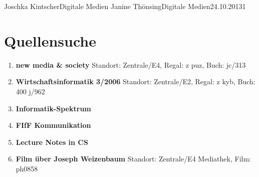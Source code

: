 \documentclass{lib/wa}
\begin{document}
  {Joschka Kintscher}{Digitale Medien}
  {Janine Thönsing}{Digitale Medien}{24.10.2013}{1}


\section{Quellensuche}

  \begin{enumerate}
    \item\textbf{new media \& society}
    \newline
    Standort: Zentrale/E4, Regal: z puz, Buch: jc/313
    \newline
    \cite{vergeer2013}

    \item\textbf{Wirtschaftsinformatik 3/2006}
    \newline
    Standort: Zentrale/E2, Regal: z kyb, Buch: 400 j/962
    \newline
    \cite{thiesse2006}

    \item\textbf{Informatik-Spektrum}
    \newline
    \cite{lintu2009}

    \item\textbf{FIfF Kommunikation}
    \newline
    \cite{bockerman2013}

    \item\textbf{Lecture Notes in CS}
    \newline
    \cite{temdee2006}

    \item\textbf{Film über Joseph Weizenbaum}
    \newline
    Standort: Zentrale/E4 Mediathek, Film: ph0858
    \newline
    \cite{haas2006}
    \newline
  \end{enumerate}

\end{document}
